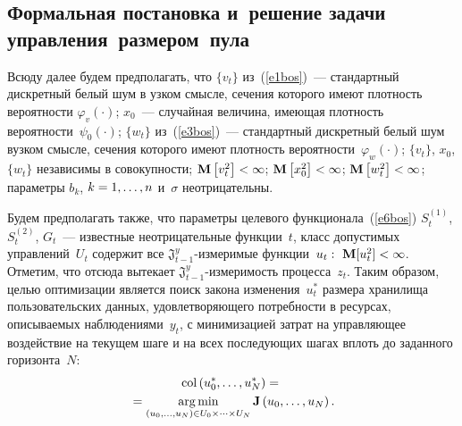 \begin{multicols}{2}
\section{Формальная постановка и~решение задачи управления~размером~пула}
  
  Всюду далее будем предполагать, что $\{v_t\}$ из~(\ref{e1bos})~--- стандартный 
дискретный белый шум в узком смысле, сечения которого имеют плотность вероятности 
$\varphi_v(\cdot)$; $x_0$~--- случайная величина, имеющая плот\-ность 
  ве\-ро\-ят\-ности~$\psi_0(\cdot)$; $\{w_t\}$ из~(\ref{e3bos})~--- стандартный дискретный 
белый шум в\linebreak узком смыс\-ле, сечения которого имеют плотность 
ве\-ро\-ят\-ности~$\varphi_w(\cdot)$; $\{v_t\}$, $x_0$, $\{w_t\}$ независимы в совокупности; 
$\mathbf{M}\left[v_t^2\right]\hm<\infty$; $\mathbf{M}\left[x_0^2\right]\hm<\infty$; 
$\mathbf{M}\left[w_t^2\right]\hm<\infty$; параметры $b_k$, $k\hm=1, \ldots ,n$ и~$\sigma$ 
неотрицательны.
  
  Будем предполагать также, что параметры целевого функционала~(\ref{e6bos}) 
$S_t^{(1)}$, $S_t^{(2)}$, $G_t$~--- известные неотрицательные функции~$t$, класс 
допустимых управлений~$U_t$ содержит все $\mathfrak{J}^y_{t-1}$-из\-ме\-ри\-мые 
функции~$u_t:\ \mathbf{M}[u_t^2]\hm<\infty$. Отметим, что отсюда вытекает 
$\mathfrak{J}^y_{t-1}$-из\-ме\-ри\-мость процесса~$z_t$. Таким образом, целью 
оптимизации является поиск закона изменения~$u_t^*$ размера хранилища 
пользовательских данных, удовлетворяющего потребности в ресурсах, описываемых 
наблюдениями~$y_t$, с минимизацией затрат на управляющее воздействие на текущем шаге 
и на всех последующих шагах вплоть до заданного горизонта~$N$:
    \begin{multline}
  \mathrm{col} \left( u_0^*, \ldots ,u_N^*\right) ={}\\
    {}=\mathop{\mathrm{arg}\,\mathrm{min}}\limits_{(u_0,\ldots , u_N)\in U_0\times \cdots\times U_N} 
  \mathbf{J}\left( u_0,\ldots ,u_N\right).
    \label{e7bos}
    \end{multline}
  
  \medskip
  

\end{multicols}
